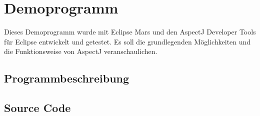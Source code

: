 \chapter{Demoprogramm}
\label{chap:demoprogramm}
Dieses Demoprogramm wurde mit Eclipse Mars und den AspectJ Developer Tools für Eclipse entwickelt und getestet. Es soll die grundlegenden Möglichkeiten und die Funktionsweise von AspectJ veranschaulichen.
\section{Programmbeschreibung}
\label{demo_beschreibung}

\section{Source Code}
\label{demo_source}